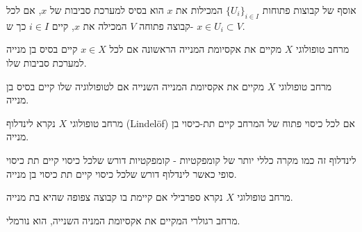 \documentclass{tstextbook}
\begin{document}
\begin{definition}
אוסף של קבוצות פתוחות \(\{U_i\}_{i \in I}\) המכילות את \(x\) הוא בסיס למערכת סביבות של \(x\), אם לכל קבוצה פתוחה \(V\) המכילה את \(x\), קיים \(i \in I\) כך ש- \(x \in U_i \subset V\).

\end{definition}
\begin{definition}
מרחב טופולוגי \(X\) מקיים את אקסיומת המנייה הראשונה אם לכל \(x \in X\) קיים בסיס בן מנייה למערכת סביבות שלו.

\end{definition}
\begin{definition}
מרחב טופולוגי \(X\) מקיים את אקסיומת המנייה השנייה אם לטופולוגיה שלו קיים בסיס בן מנייה.

\end{definition}
\begin{definition}
מרחב טופולוגי \(X\) נקרא לינדלוף (Lindelöf) אם לכל כיסוי פתוח של המרחב קיים תת-כיסוי בן מנייה.

\end{definition}
\begin{remark}
לינדלוף זה כמו מקרה כללי יותר של קומפקטיות - קומפקטיות דורש שלכל כיסוי קיים תת כיסוי סופי כאשר לינדלוף דורש שלכל כיסוי קיים תת כיסוי בן מנייה.

\end{remark}
\begin{definition}
מרחב טופולוגי \(X\) נקרא ספרבילי אם קיימת בו קבוצה צפופה שהיא בת מנייה.

\end{definition}
\begin{proposition}
מרחב רגולרי המקיים את אקסיומת המניה השנייה, הוא נורמלי.

\end{proposition}
\end{document}
